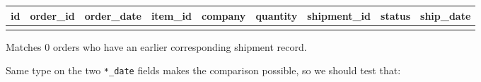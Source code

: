 \documentclass[
]{article}
\newcounter{none} %
\begin{document}
{\def\LTcaptype{none} %
\begin{longtable}[]{@{}
  >{\raggedleft\arraybackslash}p{}
  >{\raggedleft\arraybackslash}p{}
  >{\raggedright\arraybackslash}p{}
  >{\raggedleft\arraybackslash}p{}
  >{\raggedright\arraybackslash}p{}
  >{\raggedleft\arraybackslash}p{}
  >{\raggedleft\arraybackslash}p{}
  >{\raggedright\arraybackslash}p{}
  >{\raggedright\arraybackslash}p{}@{}}
\toprule\noalign{}
\begin{minipage}[b]{\linewidth}\raggedleft
id
\end{minipage} & \begin{minipage}[b]{\linewidth}\raggedleft
order\_id
\end{minipage} & \begin{minipage}[b]{\linewidth}\raggedright
order\_date
\end{minipage} & \begin{minipage}[b]{\linewidth}\raggedleft
item\_id
\end{minipage} & \begin{minipage}[b]{\linewidth}\raggedright
company
\end{minipage} & \begin{minipage}[b]{\linewidth}\raggedleft
quantity
\end{minipage} & \begin{minipage}[b]{\linewidth}\raggedleft
shipment\_id
\end{minipage} & \begin{minipage}[b]{\linewidth}\raggedright
status
\end{minipage} & \begin{minipage}[b]{\linewidth}\raggedright
ship\_date
\end{minipage} \\
\midrule\noalign{}
\endhead
\bottomrule\noalign{}
\endlastfoot
\end{longtable}
}

Matches 0 orders who have an earlier corresponding shipment record.

Same type on the two \texttt{*\_date} fields makes the comparison
possible, so we should test that:
\end{document}
